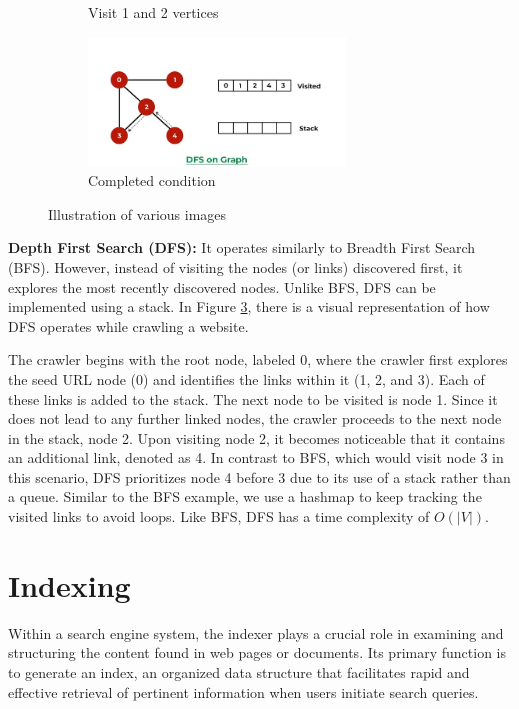 \begin{figure}[ht]
\begin{subfigure}[b]{0.5\textwidth}
    \caption{Visit 1 and 2 vertices} 
    \label{fig7:c} 
  \end{subfigure}%
  \begin{subfigure}[b]{0.5\textwidth}
    \centering
    \includegraphics[width=0.75\textwidth]{images/dfs-4.png} 
    \caption{Completed condition} 
    \label{fig7:d} 
  \end{subfigure} 
  \caption{Illustration of various images}
  \label{fig:dfs} 
\end{figure}

\textbf{Depth First Search (DFS):} It operates similarly to Breadth First Search (BFS). However, instead of visiting the nodes (or links) discovered first, it explores the most recently discovered nodes. Unlike BFS, DFS can be implemented using a stack. In Figure \ref{fig:dfs}, there is a visual representation of how DFS operates while crawling a website.

The crawler begins with the root node, labeled 0, where the crawler first explores the seed URL node (0) and identifies the links within it (1, 2, and 3). Each of these links is added to the stack. The next node to be visited is node 1. Since it does not lead to any further linked nodes, the crawler proceeds to the next node in the stack, node 2. Upon visiting node 2, it becomes noticeable that it contains an additional link, denoted as 4. In contrast to BFS, which would visit node 3 in this scenario, DFS prioritizes node 4 before 3 due to its use of a stack rather than a queue. Similar to the BFS example, we use a hashmap to keep tracking the visited links to avoid loops. Like BFS, DFS has a time complexity of $O(|V|)$.

\section{Indexing}
\label{sec:indexing}
Within a search engine system, the indexer plays a crucial role in examining and structuring the content found in web pages or documents. Its primary function is to generate an index, an organized data structure that facilitates rapid and effective retrieval of pertinent information when users initiate search queries.

